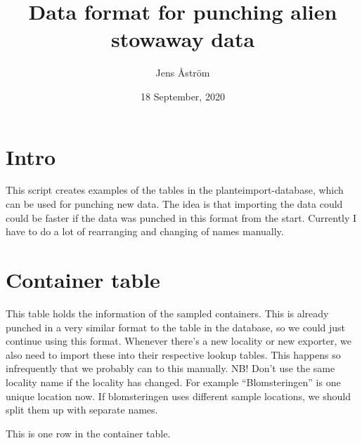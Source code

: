 \documentclass[]{article}
\title{Data format for punching alien stowaway data}
\author{Jens Åström}
\date{18 September, 2020}
\newenvironment{Shaded}{\begin{snugshade}}{\end{snugshade}}
\newcommand{\DataTypeTok}[1]{\textcolor[rgb]{0.13,0.29,0.53}{#1}}
\newcommand{\DecValTok}[1]{\textcolor[rgb]{0.00,0.00,0.81}{#1}}
\newcommand{\KeywordTok}[1]{\textcolor[rgb]{0.13,0.29,0.53}{\textbf{#1}}}
\newcommand{\NormalTok}[1]{#1}
\newcommand{\OperatorTok}[1]{\textcolor[rgb]{0.81,0.36,0.00}{\textbf{#1}}}
\newcommand{\OtherTok}[1]{\textcolor[rgb]{0.56,0.35,0.01}{#1}}
\newcommand{\StringTok}[1]{\textcolor[rgb]{0.31,0.60,0.02}{#1}}
\begin{document}
\maketitle

{
\setcounter{tocdepth}{2}
\tableofcontents
}
\hypertarget{intro}{%
\section{Intro}\label{intro}}

This script creates examples of the tables in the planteimport-database,
which can be used for punching new data. The idea is that importing the
data could could be faster if the data was punched in this format from
the start. Currently I have to do a lot of rearranging and changing of
names manually.

\hypertarget{container-table}{%
\section{Container table}\label{container-table}}

This table holds the information of the sampled containers. This is
already punched in a very similar format to the table in the database,
so we could just continue using this format. Whenever there's a new
locality or new exporter, we also need to import these into their
respective lookup tables. This happens so infrequently that we probably
can to this manually. NB! Don't use the same locality name if the
locality has changed. For example ``Blomsteringen'' is one unique
location now. If blomsteringen uses different sample locations, we
should split them up with separate names.

This is one row in the container table.

\begin{Shaded}
\end{Shaded}
\end{document}

